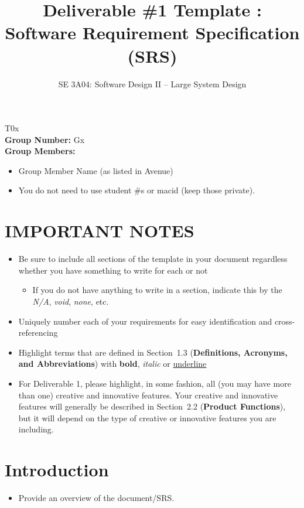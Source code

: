 \documentclass[]{article}
\title{Deliverable \#1 Template : Software Requirement Specification (SRS)}
\author{SE 3A04: Software Design II -- Large System Design}
\date{}
\begin{document}
\maketitle  
{} T0x\\
{\bf Group Number:} Gx \\
{\bf Group Members:} 
\begin{itemize}
    \item Group Member Name (as listed in Avenue)
    \item You do not need to use student \#s or macid (keep those private).
\end{itemize}
\section*{IMPORTANT NOTES}
\begin{itemize}
    \item Be sure to include all sections of the template in your document regardless whether you have something to write for each or not
    \begin{itemize}
        \item If you do not have anything to write in a section, indicate this by the \emph{N/A}, \emph{void}, \emph{none}, etc.
    \end{itemize}
    \item Uniquely number each of your requirements for easy identification and cross-referencing
    \item Highlight terms that are defined in Section~1.3 (\textbf{Definitions, Acronyms, and Abbreviations}) with \textbf{bold}, \emph{italic} or \underline{underline}
    \item For Deliverable 1, please highlight, in some fashion, all (you may have more than one) creative and innovative features. Your creative and innovative features will generally be described in Section~2.2 (\textbf{Product Functions}), but it will depend on the type of creative or innovative features you are including.
\end{itemize}
\newpage
\section{Introduction}
\label{sec:introduction}
\begin{itemize}
    \item Provide an overview of the document/SRS.
\end{itemize}
\end{document}
